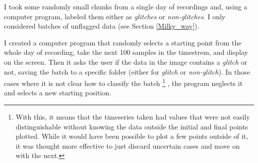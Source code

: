 \documentclass[12pt,a4paper,final]{book}			%
\begin{document}
			I took some randomly small chunks from a single day of recordings and, using a computer program, labeled them either as \textit{glitches} or \textit{non-glitches}.
			I only considered batches of unflagged data (see Section \ref{Milky_way}).			 
			
				I created a computer program that randomly selects a starting point from the whole day of recording, take the next 100 samples in the timestrem, and display on the screen. Then it asks the user if the data in the image contains a \textit{glitch} or not, saving the batch to a specific folder (either for \textit{glitch} or \textit{non-glitch}).
				In those cases where it is not clear how to classify the batch
				\footnote{With this, it means that the timeseries taken had values that were not easily distinguishable without knowing the data outside the initial and final points plotted. While it would have been possible to plot a few points outside of it, it was thought more effective to just discard uncertain cases and move on with the next.}
				, the program neglects it and selects a new starting position. 
\end{document}
